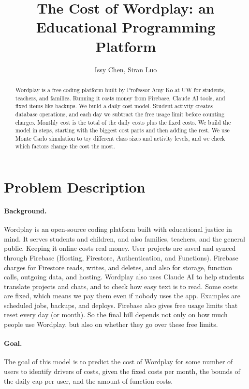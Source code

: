 \documentclass{article}
\title{The Cost of Wordplay: an Educational Programming Platform}
\author{Issy Chen, Siran Luo}
\date{}
\begin{document}
\maketitle

\begin{abstract}
Wordplay is a free coding platform built by Professor Amy Ko at UW for students, teachers, and families. Running it costs money from Firebase, Claude AI tools, and fixed items like backups. We build a daily cost model. Student activity creates database operations, and each day we subtract the free usage limit before counting charges. Monthly cost is the total of the daily costs plus the fixed costs. We build the model in steps, starting with the biggest cost parts and then adding the rest. We use Monte Carlo simulation to try different class sizes and activity levels, and we check which factors change the cost the most.
\end{abstract}

\section{Problem Description}

\paragraph{Background.}
Wordplay is an open-source coding platform built with educational justice in mind. It serves students and children, and also families, teachers, and the general public. Keeping it online costs real money. User projects are saved and synced through Firebase (Hosting, Firestore, Authentication, and Functions). Firebase charges for Firestore reads, writes, and deletes, and also for storage, function calls, outgoing data, and hosting. Wordplay also uses Claude AI to help students translate projects and chats, and to check how easy text is to read. Some costs are fixed, which means we pay them even if nobody uses the app. Examples are scheduled jobs, backups, and deploys. Firebase also gives free usage limits that reset every day (or month). So the final bill depends not only on how much people use Wordplay, but also on whether they go over these free limits.

\paragraph{Goal.}
The goal of this model is to predict the cost of Wordplay for some number of users to identify drivers of costs, given the fixed costs per month, the bounds of the daily cap per user, and the amount of function costs.
\end{document}
